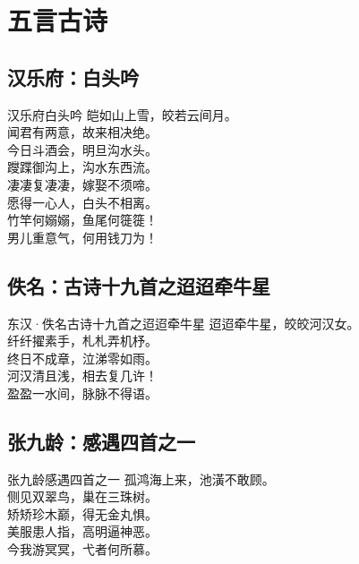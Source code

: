 \documentclass[12pt,oneside,a5paper]{book}
\begin{document}
\setcounter{tocdepth}{3}
\tableofcontents

\mainmatter

\part{五言古诗}

\chapter{汉乐府：白头吟}
\begin{poemzh}{汉乐府}{白头吟}
皑如山上雪，皎若云间月。\\
闻君有两意，故来相决绝。\\
今日斗酒会，明旦沟水头。\\
躞蹀御沟上，沟水东西流。\\
凄凄复凄凄，嫁娶不须啼。\\
愿得一心人，白头不相离。\\
竹竿何嫋嫋，鱼尾何簁簁！\\
男儿重意气，何用钱刀为！\\
\end{poemzh}

\chapter{佚名：古诗十九首之迢迢牵牛星}
\begin{poemzh}{东汉·佚名}{古诗十九首之迢迢牵牛星}
迢迢牵牛星，皎皎河汉女。\\
纤纤擢素手，札札弄机杼。\\ 
终日不成章，泣涕零如雨。\\
河汉清且浅，相去复几许！\\ 
盈盈一水间，脉脉不得语。\\
\end{poemzh}

\chapter{张九龄：感遇四首之一}
\begin{poemzh}{张九龄}{感遇四首之一}
孤鸿海上来，池潢不敢顾。\\
侧见双翠鸟，巢在三珠树。\\
矫矫珍木巅，得无金丸惧。\\
美服患人指，高明逼神恶。\\
今我游冥冥，弋者何所慕。\\ 
\end{poemzh}
\end{document}
